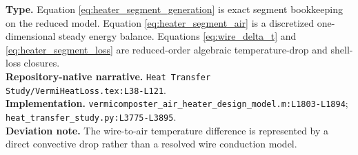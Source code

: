 \documentclass[11pt]{article}
\newcommand{\srcref}[1]{\nolinkurl{#1}}
\newcommand{\filepath}[1]{\nolinkurl{#1}}
\begin{document}
\textbf{Type.} Equation \eqref{eq:heater_segment_generation} is exact segment bookkeeping on the reduced model. Equation \eqref{eq:heater_segment_air} is a discretized one-dimensional steady energy balance. Equations \eqref{eq:wire_delta_t} and \eqref{eq:heater_segment_loss} are reduced-order algebraic temperature-drop and shell-loss closures. \\
\textbf{Repository-native narrative.} \filepath{Heat Transfer Study/VermiHeatLoss.tex:L38-L121}. \\
\textbf{Implementation.} \srcref{vermicomposter_air_heater_design_model.m:L1803-L1894}; \srcref{heat_transfer_study.py:L3775-L3895}. \\
\textbf{Deviation note.} The wire-to-air temperature difference is represented by a direct convective drop rather than a resolved wire conduction model.
\end{document}
